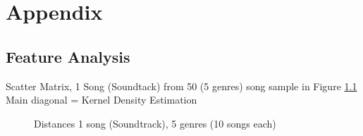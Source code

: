 \documentclass[a4paper,oneside,12pt]{report}
\begin{document}



\chapter{Appendix}

\section{Feature Analysis}

\noindent Scatter Matrix, 1 Song (Soundtack) from 50 (5 genres) song sample in Figure \ref{fig:corr8}\\
Main diagonal = Kernel Density Estimation\\

\begin{figure}[htbp]
	\centering
	\caption{Distances 1 song (Soundtrack), 5 genres (10 songs each)}
	\label{fig:corr8}
\end{figure}
\end{document}
